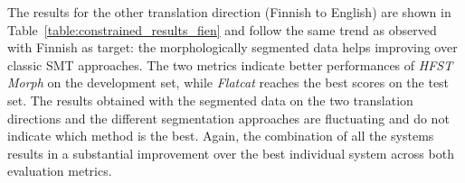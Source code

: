 \documentclass[postprint]{flammie}
\begin{document}
The results for the other translation direction (Finnish to English) are shown in Table~\ref{table:constrained_results_fien} and follow the same trend as observed with Finnish as target: the morphologically segmented data helps improving over classic SMT approaches. The two metrics indicate better performances of \textit{HFST Morph} on the development set, while \textit{Flatcat} reaches the best scores on the test set. The results obtained with the segmented data on the two translation directions and the different segmentation approaches are fluctuating and do not indicate which method is the best.
Again, the combination of all the systems results in a substantial improvement over the best individual system across both evaluation metrics.

%
\begin{table}
\end{table}
%
\end{document}
